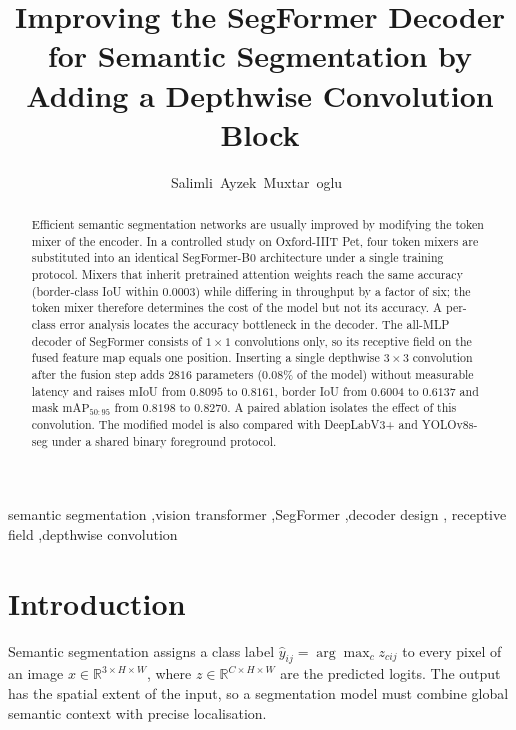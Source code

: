 \documentclass[3p,times,number]{elsarticle}
\begin{document}
\begin{frontmatter}

\title{Improving the SegFormer Decoder for Semantic Segmentation by Adding a Depthwise Convolution Block}

\author[spbstu]{Salimli~Ayzek~Muxtar~oglu~%
}

\address[spbstu]{Peter the Great St.~Petersburg Polytechnic University, 29 Politekhnicheskaya St., St.~Petersburg 195251, Russia}

\begin{abstract}
Efficient semantic segmentation networks are usually improved by modifying the token mixer
of the encoder. In a controlled study on Oxford-IIIT Pet, four token mixers are substituted
into an identical SegFormer-B0 architecture under a single training protocol. Mixers that
inherit pretrained attention weights reach the same accuracy (border-class IoU within
$0.0003$) while differing in throughput by a factor of six; the token mixer therefore
determines the cost of the model but not its accuracy. A per-class error analysis locates
the accuracy bottleneck in the decoder. The all-MLP decoder of SegFormer consists of
$1 \times 1$ convolutions only, so its receptive field on the fused feature map equals one
position. Inserting a single depthwise $3 \times 3$ convolution after the fusion step adds
$2816$ parameters ($0.08$\% of the model) without measurable latency and raises mIoU from
$0.8095$ to $0.8161$, border IoU from $0.6004$ to $0.6137$ and mask $\mathrm{mAP}_{50:95}$
from $0.8198$ to $0.8270$. A paired ablation isolates the effect of this convolution. The
modified model is also compared with DeepLabV3+ and YOLOv8s-seg under a shared binary
foreground protocol.
\end{abstract}

\begin{keyword}
semantic segmentation \sep vision transformer \sep SegFormer \sep decoder design \sep
receptive field \sep depthwise convolution
\end{keyword}

\end{frontmatter}

\section{Introduction}

Semantic segmentation assigns a class label $\hat{y}_{ij} = \arg\max_c z_{cij}$ to every
pixel of an image $x \in \mathbb{R}^{3 \times H \times W}$, where
$z \in \mathbb{R}^{C \times H \times W}$ are the predicted logits. The output has the
spatial extent of the input, so a segmentation model must combine global semantic context
with precise localisation.
\end{document}
